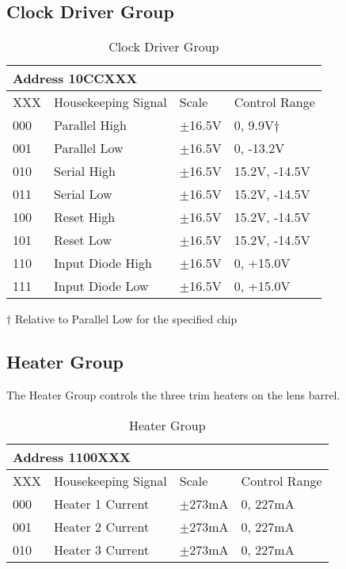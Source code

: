 \documentclass[12pt]{article}
\let\oldsubsection\subsection
\renewcommand{\subsection}{\FloatBarrier\oldsubsection}
\begin{document}
\subsection{Clock Driver Group}
\begin{table}[ht!]
\caption{Clock Driver Group}
\begin{tabular}{|l|l|l|l|}
\hline
\multicolumn{4}{|l|}{Address 10CCXXX} \\
\hline
XXX & Housekeeping Signal & Scale  & Control Range \\
\hline
000 & Parallel High & $\pm$16.5V & 0, 9.9V$\dagger$ \\
001 &Parallel Low &$\pm$16.5V & 0, -13.2V \\
010 & Serial High &$\pm$16.5V & 15.2V, -14.5V \\
011 & Serial Low &$\pm$16.5V & 15.2V, -14.5V \\
100 & Reset High &$\pm$16.5V & 15.2V, -14.5V \\
101 &Reset Low &$\pm$16.5V & 15.2V, -14.5V \\
110 &Input Diode High &$\pm$16.5V & 0, +15.0V \\
111 & Input Diode Low &$\pm$16.5V & 0, +15.0V \\
\hline
\end{tabular}
\vspace{5pt}

$\dagger$ Relative to Parallel Low for the specified chip
\label{clocktab}
\end{table}
\subsection{Heater Group}
The Heater Group controls the three trim heaters on the lens barrel.
\begin{table}[ht!]
\caption{Heater Group}
\begin{tabular}{|l|l|l|l|}
\hline
\multicolumn{4}{|l|}{Address 1100XXX} \\
\hline
XXX & Housekeeping Signal & Scale &  Control Range \\
\hline
000 & Heater 1 Current & $\pm$273mA & 0, 227mA \\
001 & Heater 2 Current & $\pm$273mA & 0, 227mA \\
010 & Heater 3 Current & $\pm$273mA & 0, 227mA \\
\hline
\end{tabular}

\label{heattab}
\end{table}
\end{document}
